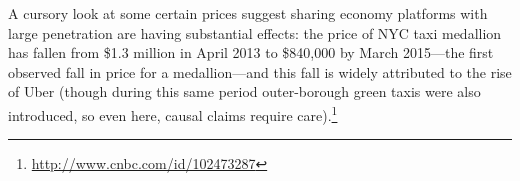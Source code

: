 A cursory look at some certain prices suggest sharing economy platforms with large penetration are having substantial effects:  
the price of NYC taxi medallion has fallen from \$1.3 million in April 2013 to \$840,000 by March 2015---the first observed fall in price for a medallion---and this fall is widely attributed to the rise of Uber (though during this same period outer-borough green taxis were also introduced, so even here, causal claims require care).\footnote{
  \url{http://www.cnbc.com/id/102473287}
}









